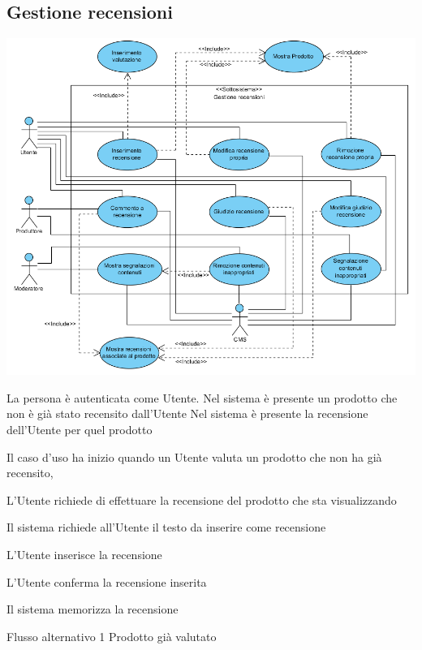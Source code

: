 \subsection{Gestione recensioni}
\begin{center}
   \includegraphics[width=\textwidth]{assets/visualParadigm/GestioneRecensioni}
\end{center}
{}
{La persona è autenticata come Utente. Nel sistema è presente un prodotto che non è già stato recensito dall'Utente}
{Nel sistema è presente la recensione dell'Utente per quel prodotto}
{\begin{enumCU}
	\item Il caso d'uso ha inizio quando un Utente valuta un prodotto che non ha già recensito, \label{insrec0}
	\item L'Utente richiede di effettuare la recensione del prodotto che sta visualizzando
	\item Il sistema richiede all'Utente il testo da inserire come recensione
	\item L'Utente inserisce la recensione\label{addrec:3}
	\item L'Utente conferma la recensione inserita
	\item Il sistema memorizza la recensione
\end{enumCU}}
%
{Flusso alternativo 1}%
{Prodotto già valutato}%
